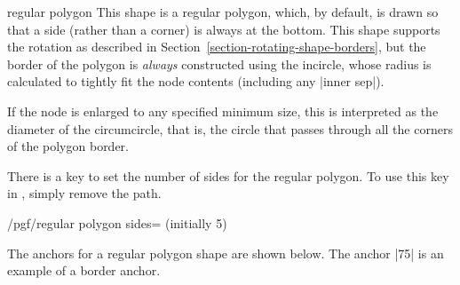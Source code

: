 \begin{shape}{regular polygon}
    This shape is a regular polygon, which, by default, is drawn so that a side
    (rather than a corner) is always at the bottom. This shape supports the
    rotation as described in Section~\ref{section-rotating-shape-borders}, but
    the border of the polygon is \emph{always} constructed using the incircle,
    whose radius is calculated to tightly fit the node contents (including any
    |inner sep|).
\begin{codeexample}[preamble={\usetikzlibrary{shapes.geometric}}]
\end{codeexample}

    If the node is enlarged to any specified minimum size, this is interpreted
    as the diameter of the circumcircle, that is, the circle that passes
    through all the corners of the polygon border.
\begin{codeexample}[preamble={\usetikzlibrary{shapes.geometric}}]
\end{codeexample}

    There is a \pgfname{} key to set the number of sides for the regular
    polygon. To use this key in \tikzname, simply remove the 
    path.

    \begin{key}{/pgf/regular polygon sides= (initially 5)}
    \end{key}

    The anchors for a regular polygon shape are shown below. The anchor |75| is
    an example of a border anchor.
\begin{codeexample}[preamble={\usetikzlibrary{shapes.geometric}}]
\Huge
{}
\end{codeexample}
\end{shape}

